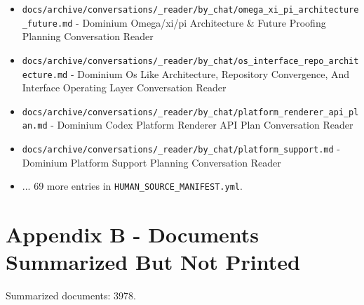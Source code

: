 \documentclass[10.5pt,a4paper,openany]{book}
\begin{document}
\begin{itemize}
\item \texttt{docs/\allowbreak{}archive/\allowbreak{}conversations/\allowbreak{}\_\allowbreak{}reader/\allowbreak{}by\_\allowbreak{}chat/\allowbreak{}omega\_\allowbreak{}xi\_\allowbreak{}pi\_\allowbreak{}architecture\_\allowbreak{}future.\allowbreak{}md} -\allowbreak{} Dominium Omega/\allowbreak{}xi/\allowbreak{}pi Architecture \& Future Proofing Planning Conversation Reader
\item \texttt{docs/\allowbreak{}archive/\allowbreak{}conversations/\allowbreak{}\_\allowbreak{}reader/\allowbreak{}by\_\allowbreak{}chat/\allowbreak{}os\_\allowbreak{}interface\_\allowbreak{}repo\_\allowbreak{}architecture.\allowbreak{}md} -\allowbreak{} Dominium Os Like Architecture, Repository Convergence, And Interface Operating Layer Conversation Reader
\item \texttt{docs/\allowbreak{}archive/\allowbreak{}conversations/\allowbreak{}\_\allowbreak{}reader/\allowbreak{}by\_\allowbreak{}chat/\allowbreak{}platform\_\allowbreak{}renderer\_\allowbreak{}api\_\allowbreak{}plan.\allowbreak{}md} -\allowbreak{} Dominium Codex Platform Renderer API Plan Conversation Reader
\item \texttt{docs/\allowbreak{}archive/\allowbreak{}conversations/\allowbreak{}\_\allowbreak{}reader/\allowbreak{}by\_\allowbreak{}chat/\allowbreak{}platform\_\allowbreak{}support.\allowbreak{}md} -\allowbreak{} Dominium Platform Support Planning Conversation Reader
\item .\allowbreak{}.\allowbreak{}.\allowbreak{} 69 more entries in \texttt{HUMAN\_\allowbreak{}SOURCE\_\allowbreak{}MANIFEST.\allowbreak{}yml}.\allowbreak{}
\end{itemize}

\section{Appendix B - Documents Summarized But Not Printed}

Summarized documents: 3978.\allowbreak{}
\end{document}
